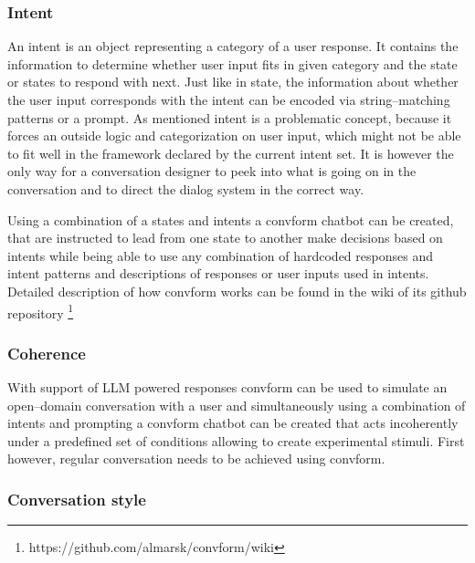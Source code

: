 \documentclass[12pt]{report}
\begin{document}
{\subsubsection{Intent}
An intent is an object representing a category of a user response.
It contains the information to determine whether
user input fits in given category and
the state or states to respond with next.
Just like in state, the information about whether the user input
corresponds with the intent can be encoded via
string–matching patterns or a prompt.
As mentioned intent is a problematic concept,
because it forces an outside logic and categorization
on user input, which might not be able to fit well
in the framework declared by the current intent set.
It is however the only way for a conversation designer
to peek into what is going on in the conversation
and to direct the dialog system in the correct way.

\par
Using a combination of a states and intents a convform chatbot can be created,
that are instructed to lead from one state to another
make decisions based on intents
while being able to use any combination of
hardcoded responses and intent patterns
and descriptions of responses or user inputs used in intents.
Detailed description of how convform works can be found
in the wiki of its github repository \footnote{https://github.com/almarsk/convform/wiki}

\subsubsection{Coherence}
With support of LLM powered responses
convform can be used to simulate
an open–domain conversation with a user
and simultaneously using a combination
of intents and prompting
a convform chatbot can be created
that acts incoherently under a predefined set of conditions
allowing to create experimental stimuli.
First however, regular conversation needs to be achieved using convform.

\subsubsection{Conversation style}

}
\end{document}
